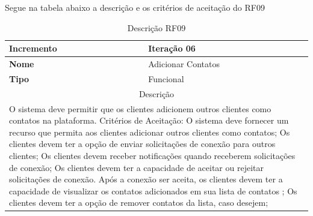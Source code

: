 \clearpage
Segue na tabela abaixo a descrição e os critérios de aceitação do RF09
\begin{table}[htb]
	\centering
	\caption{\label{Formatação do texto.}Descrição RF09}	
	\begin{tabular}{|l|p{11cm}|}
		\hline
		\textbf{Incremento}    & Iteração 06\\ \hline
		\textbf{Nome}    & Adicionar Contatos\\ \hline
		\textbf{Tipo}    & Funcional\\ \hline
		\multicolumn{2}{|c|}{Descrição}\\ \hline
		\multicolumn{2}{|p{12cm}|}{
			O sistema deve permitir que os clientes adicionem outros clientes como contatos na plataforma. \newline
			\newline Critérios de Aceitação: \newline
			O sistema deve fornecer um recurso que permita aos clientes adicionar outros clientes como contatos; \newline
            Os clientes devem ter a opção de enviar solicitações de conexão para outros clientes; \newline
			Os clientes devem receber notificações quando receberem solicitações de conexão; \newline
			Os clientes devem ter a capacidade de aceitar ou rejeitar solicitações de conexão.
Após a conexão ser aceita, os clientes devem ter a capacidade de visualizar os contatos adicionados em sua lista de contatos
; \newline
Os clientes devem ter a opção de remover contatos da lista, caso desejem;
			} \\ \hline
	\end{tabular}
\end{table}

